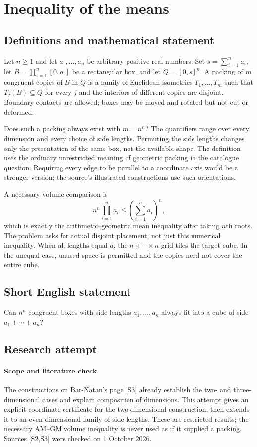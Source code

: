 \documentclass[11pt,a4paper]{article}
\begin{document}
\section*{Inequality of the means}\label{statement}

\subsection{Definitions and mathematical statement}
Let $n\ge1$ and let $a_1,\ldots,a_n$ be arbitrary positive real numbers.
Set $s=\sum_{i=1}^n a_i$, let
$B=\prod_{i=1}^n[0,a_i]$ be a rectangular box, and let $Q=[0,s]^n$.
A packing of $m$ congruent copies of $B$ in $Q$ is a family of Euclidean
isometries $T_1,\ldots,T_m$ such that $T_j(B)\subseteq Q$ for every $j$
and the interiors of different copies are disjoint. Boundary contacts
are allowed; boxes may be moved and rotated but not cut or deformed.

Does such a packing always exist with $m=n^n$? The quantifiers range
over every dimension and every choice of side lengths. Permuting the
side lengths changes only the presentation of the same box, not the
available shape. The definition uses the ordinary unrestricted meaning
of geometric packing in the catalogue question. Requiring every edge to
be parallel to a coordinate axis would be a stronger version; the source's
illustrated constructions use such orientations.

A necessary volume comparison is
\[
 n^n\prod_{i=1}^n a_i\le\left(\sum_{i=1}^n a_i\right)^n,
\]
which is exactly the arithmetic--geometric mean inequality after taking
$n$th roots. The problem asks for actual disjoint placement, not just this
numerical inequality. When all lengths equal $a$, the $n\times\cdots\times n$
grid tiles the target cube. In the unequal case, unused space is permitted
and the copies need not cover the entire cube.
\subsection{Short English statement}
Can $n^n$ congruent boxes with side lengths $a_1,\ldots,a_n$ always fit into a cube of side $a_1+\cdots+a_n$?
\subsection{Research attempt}
\paragraph{Scope and literature check.}
The constructions on Bar-Natan's page [S3] already establish the two- and
three-dimensional cases and explain composition of dimensions. This attempt
gives an explicit coordinate certificate for the two-dimensional construction,
then extends it to an even-dimensional family of side lengths. These are
restricted results; the necessary AM--GM volume inequality is never used as
if it supplied a packing. Sources [S2,S3] were checked on 1 October 2026.
\end{document}
